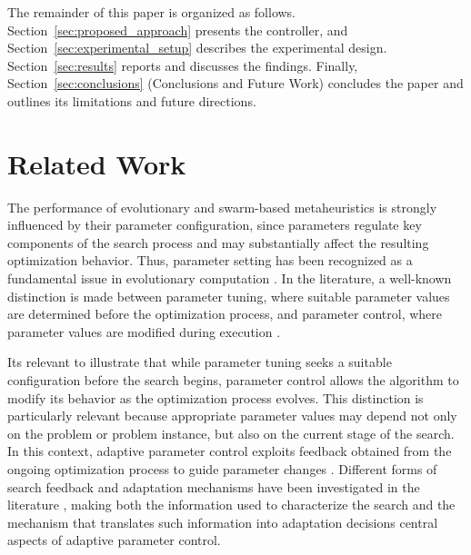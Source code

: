 \documentclass[journal,article,submit,moreauthors]{Definitions/mdpi}
\begin{document}
The remainder of this paper is organized as follows. Section~\ref{sec:proposed_approach} presents the controller, and Section~\ref{sec:experimental_setup} describes the experimental design. Section~\ref{sec:results} reports and discusses the findings. Finally, Section~\ref{sec:conclusions} (Conclusions and Future Work) concludes the paper and outlines its limitations and future directions.

\section{Related Work}

The performance of evolutionary and swarm-based metaheuristics is strongly influenced by their parameter configuration, since parameters regulate key components of the search process and may substantially affect the resulting optimization behavior. Thus, parameter setting has been recognized as a fundamental issue in evolutionary computation \cite{eiben-1999,talbi-2009}. In the literature, a well-known distinction is made between parameter tuning, where suitable parameter values are determined before the optimization process, and parameter control, where parameter values are modified during execution \cite{talbi2021,huang2019survey}.

Its relevant to illustrate that while parameter tuning seeks a suitable configuration before the search begins, parameter control allows the algorithm to modify its behavior as the optimization process evolves. This distinction is particularly relevant because appropriate parameter values may depend not only on the problem or problem instance, but also on the current stage of the search. In this context, adaptive parameter control exploits feedback obtained from the ongoing optimization process to guide parameter changes \cite{aleti2016systematic}. Different forms of search feedback and adaptation mechanisms have been investigated in the literature \cite{de2021,karafotias2014}, making both the information used to characterize the search and the mechanism that translates such information into adaptation decisions central aspects of adaptive parameter control.
\end{document}
